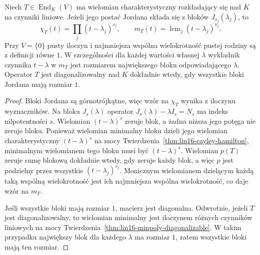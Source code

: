 \begin{wniosek}
\label{cor:lin17-jordan-minpoly}
Niech \(T\in\operatorname{End}_K(V)\)
ma wielomian charakterystyczny rozkładający się
nad \(K\) na czynniki liniowe.
Jeżeli jego postać Jordana składa się
z bloków \(J_{s_j}(\lambda_j)\), to
\[
 \chi_T(t)=\prod_j(t-\lambda_j)^{s_j},
 \qquad
 m_T(t)=\operatorname{lcm}_j(t-\lambda_j)^{s_j}.
\]
Przy \(V=\{0\}\) pusty iloczyn
i najmniejsza wspólna wielokrotność pustej rodziny
są z definicji równe \(1\).
W szczególności dla każdej wartości własnej
\(\lambda\) wykładnik czynnika
\(t-\lambda\) w \(m_T\)
jest rozmiarem największego bloku
odpowiadającego \(\lambda\).
Operator \(T\) jest diagonalizowalny
nad \(K\) dokładnie wtedy, gdy
wszystkie bloki Jordana mają rozmiar \(1\).
\end{wniosek}
\begin{proof}
Bloki Jordana są górnotrójkątne,
więc wzór na \(\chi_T\)
wynika z iloczynu wyznaczników.
Na bloku \(J_s(\lambda)\)
operator \(J_s(\lambda)-\lambda I_s=N_s\)
ma indeks nilpotentności \(s\).
Wielomian \((t-\lambda)^s\) zeruje blok,
a żadna niższa jego potęga nie zeruje bloku.
Ponieważ wielomian minimalny bloku dzieli
jego wielomian charakterystyczny
\((t-\lambda)^s\) na mocy
Twierdzenia~\ref{thm:lin16-cayley-hamilton},
minimalnym wielomianem tego bloku
musi być \((t-\lambda)^s\).
Wielomian \(p(T)\) zeruje sumę blokową
dokładnie wtedy, gdy zeruje każdy blok,
a więc \(p\) jest podzielny przez
wszystkie \((t-\lambda_j)^{s_j}\).
Monicznym wielomianem dzielącym
każdą taką wspólną wielokrotność
jest ich najmniejsza wspólna wielokrotność,
co daje wzór na \(m_T\).

Jeśli wszystkie bloki mają rozmiar \(1\),
macierz jest diagonalna.
Odwrotnie, jeżeli \(T\) jest diagonalizowalny,
to wielomian minimalny jest
iloczynem różnych czynników liniowych
na mocy
Twierdzenia~\ref{thm:lin16-minpoly-diagonalizable}.
W takim przypadku największy blok
dla każdego \(\lambda\) ma rozmiar \(1\),
zatem wszystkie bloki mają ten rozmiar.
\end{proof}

